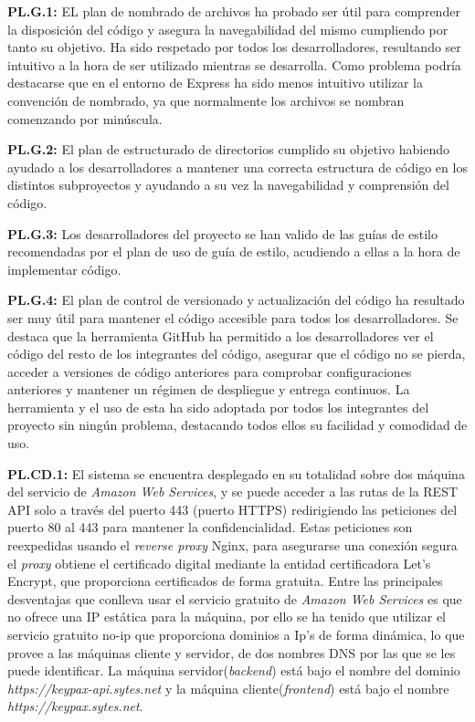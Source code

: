 \documentclass{article}
\begin{document}
\textbf{PL.G.1:}
EL plan de nombrado de archivos ha probado ser útil para comprender la disposición del código y asegura la navegabilidad del mismo cumpliendo por tanto su objetivo. Ha sido respetado por todos los desarrolladores, resultando ser intuitivo a la hora de ser utilizado mientras se desarrolla. Como problema podría destacarse que en el entorno de Express ha sido menos intuitivo utilizar la convención de nombrado, ya que normalmente los archivos se nombran comenzando por minúscula.
 
\textbf{PL.G.2:}
El plan de estructurado de directorios cumplido su objetivo habiendo ayudado a los desarrolladores a mantener una correcta estructura de código en los distintos subproyectos y ayudando a su vez la navegabilidad y comprensión del código.
 
\textbf{PL.G.3:}
Los desarrolladores del proyecto se han valido de las guías de estilo recomendadas por el plan de uso de guía de estilo, acudiendo a ellas a la hora de implementar código.
 
\textbf{PL.G.4:}
El plan de control de versionado y actualización del código ha resultado ser muy útil para mantener el código accesible para todos los desarrolladores. Se destaca que la herramienta GitHub ha permitido a los desarrolladores ver el código del resto de los integrantes del código, asegurar que el código no se pierda, acceder a versiones de código anteriores para comprobar configuraciones anteriores y mantener un régimen de despliegue y entrega continuos. La herramienta y el uso de esta ha sido adoptada por todos los integrantes del proyecto sin ningún problema, destacando todos ellos su facilidad y comodidad de uso.
 
\textbf{PL.CD.1:}
El sistema se encuentra desplegado en su totalidad sobre dos máquina del servicio de \textit{Amazon Web Services}, y se puede acceder a las rutas de la REST API solo a través del puerto 443 (puerto HTTPS) redirigiendo las peticiones del puerto 80 al 443 para mantener la confidencialidad. Estas peticiones son reexpedidas usando el \textit{reverse proxy} Nginx, para asegurarse una conexión segura el \textit{proxy} obtiene el certificado digital mediante la entidad certificadora Let's Encrypt, que proporciona certificados de forma gratuita.
Entre las principales desventajas que conlleva usar el servicio gratuito de \textit{Amazon Web Services} es que no ofrece una IP estática para la máquina, por ello se ha tenido que utilizar el servicio gratuito no-ip que proporciona dominios a Ip's de forma dinámica, lo que provee a las máquinas cliente y servidor, de dos nombres DNS por las que se les puede identificar. La máquina servidor(\textit{backend}) está bajo el nombre del dominio \textit{https://keypax-api.sytes.net} y la máquina cliente(\textit{frontend}) está bajo el nombre \textit{https://keypax.sytes.net}.
 
\end{document}
